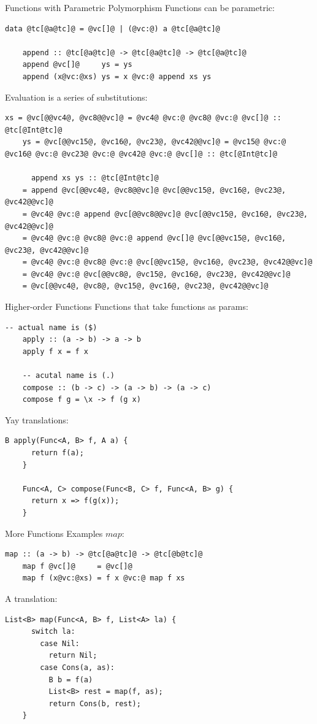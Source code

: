 \documentclass[xcolor={usenames,dvipsnames}]{beamer}
\begin{document}
\begin{frame}[fragile]{Functions with Parametric Polymorphism}
  Functions can be parametric:
  \begin{lstlisting}[style=hask]
    data @tc[@a@tc]@ = @vc[]@ | (@vc:@) a @tc[@a@tc]@

    append :: @tc[@a@tc]@ -> @tc[@a@tc]@ -> @tc[@a@tc]@
    append @vc[]@     ys = ys
    append (x@vc:@xs) ys = x @vc:@ append xs ys
  \end{lstlisting}

  Evaluation is a series of substitutions:
  \begin{lstlisting}[style=hask]
    xs = @vc[@@vc4@, @vc8@@vc]@ = @vc4@ @vc:@ @vc8@ @vc:@ @vc[]@ :: @tc[@Int@tc]@
    ys = @vc[@@vc15@, @vc16@, @vc23@, @vc42@@vc]@ = @vc15@ @vc:@ @vc16@ @vc:@ @vc23@ @vc:@ @vc42@ @vc:@ @vc[]@ :: @tc[@Int@tc]@

      append xs ys :: @tc[@Int@tc]@
    = append @vc[@@vc4@, @vc8@@vc]@ @vc[@@vc15@, @vc16@, @vc23@, @vc42@@vc]@
    = @vc4@ @vc:@ append @vc[@@vc8@@vc]@ @vc[@@vc15@, @vc16@, @vc23@, @vc42@@vc]@
    = @vc4@ @vc:@ @vc8@ @vc:@ append @vc[]@ @vc[@@vc15@, @vc16@, @vc23@, @vc42@@vc]@
    = @vc4@ @vc:@ @vc8@ @vc:@ @vc[@@vc15@, @vc16@, @vc23@, @vc42@@vc]@
    = @vc4@ @vc:@ @vc[@@vc8@, @vc15@, @vc16@, @vc23@, @vc42@@vc]@
    = @vc[@@vc4@, @vc8@, @vc15@, @vc16@, @vc23@, @vc42@@vc]@
  \end{lstlisting}
\end{frame}

\begin{frame}[fragile]{Higher-order Functions}
  Functions that take functions as params:
  \begin{lstlisting}[style=hask]
    -- actual name is ($)
    apply :: (a -> b) -> a -> b
    apply f x = f x

    -- acutal name is (.)
    compose :: (b -> c) -> (a -> b) -> (a -> c)
    compose f g = \x -> f (g x)
  \end{lstlisting}

  Yay translations:
  \begin{lstlisting}[style=hask]
    B apply(Func<A, B> f, A a) {
      return f(a);
    }

    Func<A, C> compose(Func<B, C> f, Func<A, B> g) {
      return x => f(g(x));
    }
  \end{lstlisting}
\end{frame}

\begin{frame}[fragile]{More Functions Examples}
  $map$:
  \begin{lstlisting}[style=hask]
    map :: (a -> b) -> @tc[@a@tc]@ -> @tc[@b@tc]@
    map f @vc[]@     = @vc[]@
    map f (x@vc:@xs) = f x @vc:@ map f xs
  \end{lstlisting}

  A translation:
  \begin{lstlisting}[style=hask]
    List<B> map(Func<A, B> f, List<A> la) {
      switch la:
        case Nil:
          return Nil;
        case Cons(a, as):
          B b = f(a)
          List<B> rest = map(f, as);
          return Cons(b, rest);
    }
  \end{lstlisting}
\end{frame}
\end{document}
